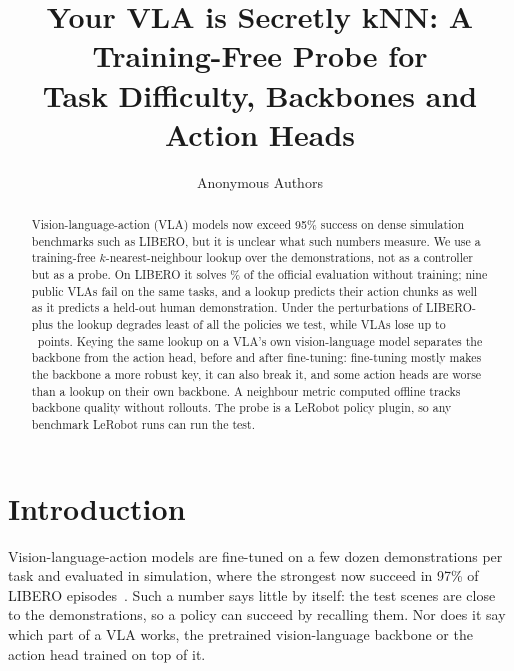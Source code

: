 \documentclass{article}
\title{Your VLA is Secretly kNN: A Training-Free Probe for\\Task Difficulty, Backbones and Action Heads}
\author{Anonymous Authors}
\begin{document}
\maketitle

\begin{abstract}
Vision-language-action (VLA) models now exceed 95\% success on dense simulation benchmarks such as LIBERO, but it is
unclear what such numbers measure. We use a training-free $k$-nearest-neighbour lookup over the demonstrations, not as
a controller but as a probe. On LIBERO it solves \KnnAvg\% of the official evaluation without training; nine public
VLAs fail on the same tasks, and a lookup predicts their action chunks as well as it predicts a held-out human
demonstration. Under the perturbations of LIBERO-plus the lookup degrades least of all the policies we test, while VLAs
lose up to \MaxVlaDrop\ points. Keying the same lookup on a VLA's own vision-language model separates the backbone from
the action head, before and after fine-tuning: fine-tuning mostly makes the backbone a more robust key, it can also
break it, and some action heads are worse than a lookup on their own backbone. A neighbour metric computed offline
tracks backbone quality without rollouts. The probe is a LeRobot policy plugin, so any benchmark LeRobot runs can
run the test.
\end{abstract}


\section{Introduction}

Vision-language-action models are fine-tuned on a few dozen demonstrations per task and evaluated in simulation, where
the strongest now succeed in 97\% of LIBERO episodes~\citep{liu2023libero}. Such a number says little by itself: the
test scenes are close to the demonstrations, so a policy can succeed by recalling them. Nor does it say which part of
a VLA works, the pretrained vision-language backbone or the action head trained on top of it.
\end{document}
